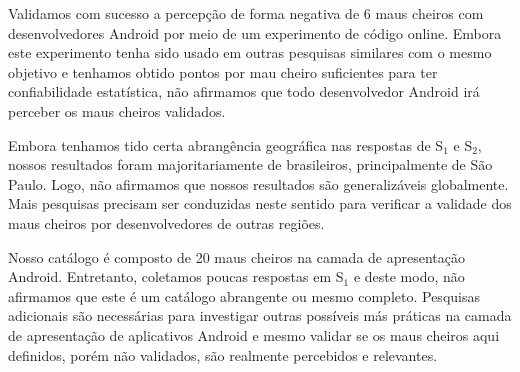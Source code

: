 Validamos com sucesso a percepção de forma negativa de 6 maus cheiros com desenvolvedores Android por meio de um experimento de código online. Embora este experimento tenha sido usado em outras pesquisas similares com o mesmo objetivo \cite{AnicheSmellsMVC:17, MvcSmells:16, Palomba_Do_2014} e tenhamos obtido pontos por mau cheiro suficientes para ter confiabilidade estatística, não afirmamos que todo desenvolvedor Android irá perceber os maus cheiros validados. 

Embora tenhamos tido certa abrangência geográfica nas respostas de S$_1$ e S$_2$, nossos resultados foram majoritariamente de brasileiros, principalmente de São Paulo. Logo, não afirmamos que nossos resultados são generalizáveis globalmente. Mais pesquisas precisam ser conduzidas neste sentido para verificar a validade dos maus cheiros por desenvolvedores de outras regiões. 

Nosso catálogo é composto de 20 maus cheiros na camada de apresentação Android. Entretanto, coletamos poucas respostas em S$_1$ e deste modo, não afirmamos que este é um catálogo abrangente ou mesmo completo. Pesquisas adicionais são necessárias para investigar outras possíveis más práticas na camada de apresentação de aplicativos Android e mesmo validar se os maus cheiros aqui definidos, porém não validados, são realmente percebidos e relevantes. 

